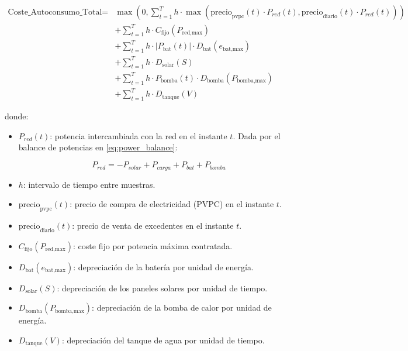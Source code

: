 \begin{equation} \label{eq:cost_regulated}
	\begin{split}
		\text{Coste\_Autoconsumo\_Total} = & \max \left(0, \sum_{t=1}^{T} h \cdot \max(\text{precio}_\text{pvpc}(t) \cdot P_{red}(t), \text{precio}_\text{diario}(t) \cdot P_{red}(t)) \right) \\
		                                   & + \sum_{t=1}^{T} h \cdot C_\text{fijo}(P_\text{red,max})                                                                                          \\
		                                   & + \sum_{t=1}^{T} h \cdot |P_\text{bat}(t)| \cdot D_\text{bat}(e_\text{bat,max})                                                                   \\
		                                   & + \sum_{t=1}^{T} h \cdot D_\text{solar}(S)                                                                                                        \\
		                                   & + \sum_{t=1}^{T} h \cdot P_\text{bomba}(t) \cdot D_\text{bomba}(P_\text{bomba,max})                                                               \\
		                                   & + \sum_{t=1}^{T} h \cdot D_\text{tanque}(V)
	\end{split}
\end{equation}

donde:

\begin{itemize}
	\item $P_{red}(t)$: potencia intercambiada con la red en el instante $t$.
	      Dada por el balance de potencias en \eqref{eq:power_balance}:

	      \begin{equation} \label{eq:p_grid}
		      P_{red} =  - P_{solar} + P_{carga} + P_{bat} + P_{bomba}
	      \end{equation}

	\item $h$: intervalo de tiempo entre muestras.
	\item $\text{precio}_\text{pvpc}(t)$: precio de compra de electricidad (PVPC)
	      en el instante $t$.
	\item $\text{precio}_\text{diario}(t)$: precio de venta de excedentes en
	      el instante $t$.
	\item $C_\text{fijo}(P_\text{red,max})$: coste fijo por potencia máxima
	      contratada.
	\item $D_\text{bat}(e_\text{bat,max})$: depreciación de la batería por unidad
	      de energía.
	\item $D_\text{solar}(S)$: depreciación de los paneles solares por unidad de
	      tiempo.
	\item $D_\text{bomba}(P_\text{bomba,max})$: depreciación de la bomba de calor
	      por unidad de energía.
	\item $D_\text{tanque}(V)$: depreciación del tanque de agua por unidad de
	      tiempo.
\end{itemize}


